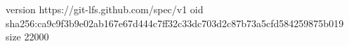 version https://git-lfs.github.com/spec/v1
oid sha256:ca9c9f3b9e02ab167e67d444c7ff32c33dc703d2c87b73a5cfd584259875b019
size 22000
